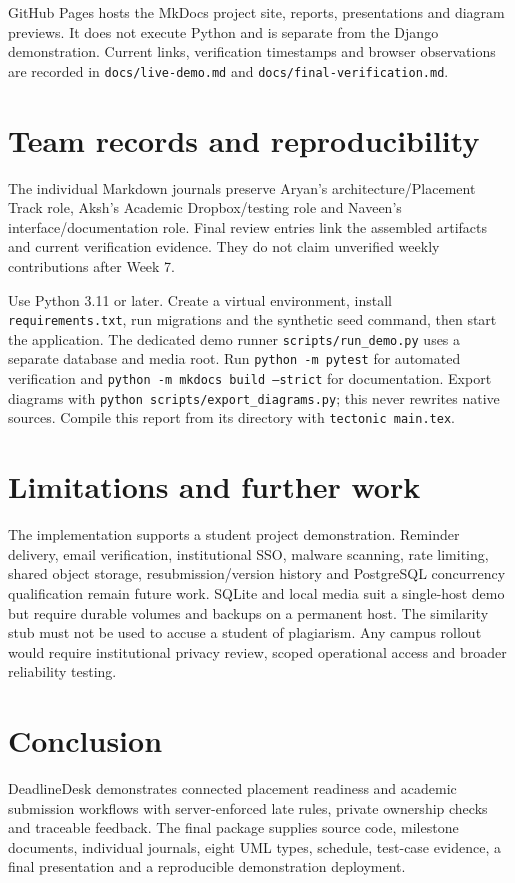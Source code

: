 \documentclass[11pt,a4paper]{article}
\begin{document}
GitHub Pages hosts the MkDocs project site, reports, presentations and diagram previews. It does not execute Python and is separate from the Django demonstration. Current links, verification timestamps and browser observations are recorded in \nolinkurl{docs/live-demo.md} and \nolinkurl{docs/final-verification.md}.

\section{Team records and reproducibility}
The individual Markdown journals preserve Aryan's architecture/Placement Track role, Aksh's Academic Dropbox/testing role and Naveen's interface/documentation role. Final review entries link the assembled artifacts and current verification evidence. They do not claim unverified weekly contributions after Week 7.

Use Python 3.11 or later. Create a virtual environment, install \nolinkurl{requirements.txt}, run migrations and the synthetic seed command, then start the application. The dedicated demo runner \nolinkurl{scripts/run_demo.py} uses a separate database and media root. Run \texttt{python -m pytest} for automated verification and \texttt{python -m mkdocs build --strict} for documentation. Export diagrams with \texttt{python scripts/export\_diagrams.py}; this never rewrites native sources. Compile this report from its directory with \texttt{tectonic main.tex}.

\section{Limitations and further work}
The implementation supports a student project demonstration. Reminder delivery, email verification, institutional SSO, malware scanning, rate limiting, shared object storage, resubmission/version history and PostgreSQL concurrency qualification remain future work. SQLite and local media suit a single-host demo but require durable volumes and backups on a permanent host. The similarity stub must not be used to accuse a student of plagiarism. Any campus rollout would require institutional privacy review, scoped operational access and broader reliability testing.

\section{Conclusion}
DeadlineDesk demonstrates connected placement readiness and academic submission workflows with server-enforced late rules, private ownership checks and traceable feedback. The final package supplies source code, milestone documents, individual journals, eight UML types, schedule, test-case evidence, a final presentation and a reproducible demonstration deployment.
\end{document}
